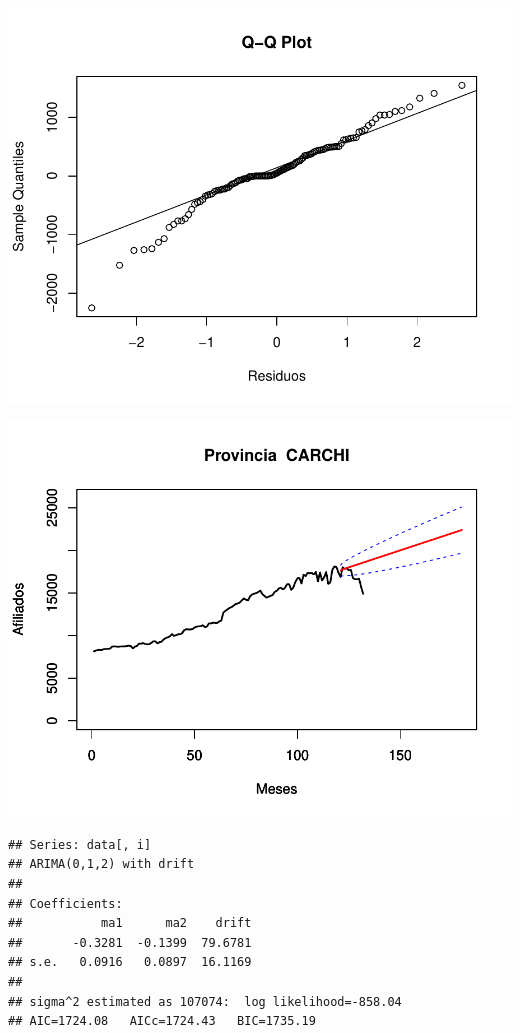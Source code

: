 \documentclass[11pt,a4paper,oneside]{article}\usepackage[]{graphicx}\usepackage[]{color}
\makeatletter
\def\maxwidth{ %
  \ifdim\Gin@nat@width>\linewidth
    \linewidth
  \else
    \Gin@nat@width
  \fi
}
\newenvironment{kframe}{%
 \def\at@end@of@kframe{}%
 \ifinner\ifhmode%
  \def\at@end@of@kframe{\end{minipage}}%
  \begin{minipage}{\columnwidth}%
 \fi\fi%
 \def\FrameCommand##1{\hskip\@totalleftmargin \hskip-\fboxsep
 \colorbox{shadecolor}{##1}\hskip-\fboxsep
     \hskip-\linewidth \hskip-\@totalleftmargin \hskip\columnwidth}%
 \MakeFramed {\advance\hsize-\width
   \@totalleftmargin\z@ \linewidth\hsize
   \@setminipage}}%
 {\par\unskip\endMakeFramed%
 \at@end@of@kframe}
\newenvironment{knitrout}{}{} %
\makeatother
\begin{document}
\begin{knitrout}
{}




{\centering \includegraphics[width=\maxwidth]{figure/unnamed-chunk-16-9} 

}




{\centering \includegraphics[width=\maxwidth]{figure/unnamed-chunk-16-10} 

}


\begin{kframe}\begin{verbatim}
## Series: data[, i] 
## ARIMA(0,1,2) with drift         
## 
## Coefficients:
##           ma1      ma2    drift
##       -0.3281  -0.1399  79.6781
## s.e.   0.0916   0.0897  16.1169
## 
## sigma^2 estimated as 107074:  log likelihood=-858.04
## AIC=1724.08   AICc=1724.43   BIC=1735.19
\end{verbatim}
\end{kframe}


\end{knitrout}
\end{document}
